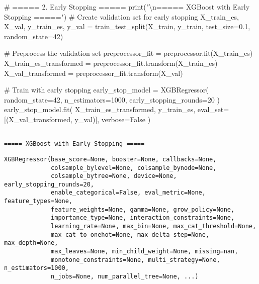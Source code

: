 \documentclass[
  letterpaper,
  DIV=11,
  numbers=noendperiod]{scrreprt}
\newenvironment{Shaded}{\begin{snugshade}}{\end{snugshade}}
\newcommand{\BuiltInTok}[1]{\textcolor[rgb]{0.00,0.23,0.31}{#1}}
\newcommand{\CharTok}[1]{\textcolor[rgb]{0.13,0.47,0.30}{#1}}
\newcommand{\CommentTok}[1]{\textcolor[rgb]{0.37,0.37,0.37}{#1}}
\newcommand{\DecValTok}[1]{\textcolor[rgb]{0.68,0.00,0.00}{#1}}
\newcommand{\FloatTok}[1]{\textcolor[rgb]{0.68,0.00,0.00}{#1}}
\newcommand{\NormalTok}[1]{\textcolor[rgb]{0.00,0.23,0.31}{#1}}
\newcommand{\OperatorTok}[1]{\textcolor[rgb]{0.37,0.37,0.37}{#1}}
\newcommand{\StringTok}[1]{\textcolor[rgb]{0.13,0.47,0.30}{#1}}
\newcommand{\VariableTok}[1]{\textcolor[rgb]{0.07,0.07,0.07}{#1}}
\begin{document}
\begin{Shaded}
\begin{Highlighting}[]
\CommentTok{\# ===== 2. Early Stopping =====}
\BuiltInTok{print}\NormalTok{(}\StringTok{"}\CharTok{\textbackslash{}n}\StringTok{===== XGBoost with Early Stopping ====="}\NormalTok{)}
\CommentTok{\# Create validation set for early stopping}
\NormalTok{X\_train\_es, X\_val, y\_train\_es, y\_val }\OperatorTok{=}\NormalTok{ train\_test\_split(X\_train, y\_train, test\_size}\OperatorTok{=}\FloatTok{0.1}\NormalTok{, random\_state}\OperatorTok{=}\DecValTok{42}\NormalTok{)}

\CommentTok{\# Preprocess the validation set}
\NormalTok{preprocessor\_fit }\OperatorTok{=}\NormalTok{ preprocessor.fit(X\_train\_es)}
\NormalTok{X\_train\_es\_transformed }\OperatorTok{=}\NormalTok{ preprocessor\_fit.transform(X\_train\_es)}
\NormalTok{X\_val\_transformed }\OperatorTok{=}\NormalTok{ preprocessor\_fit.transform(X\_val)}


\CommentTok{\# Train with early stopping}
\NormalTok{early\_stop\_model }\OperatorTok{=}\NormalTok{ XGBRegressor(}
\NormalTok{    random\_state}\OperatorTok{=}\DecValTok{42}\NormalTok{,}
\NormalTok{    n\_estimators}\OperatorTok{=}\DecValTok{1000}\NormalTok{,}
\NormalTok{    early\_stopping\_rounds}\OperatorTok{=}\DecValTok{20}
\NormalTok{)}
\NormalTok{early\_stop\_model.fit(}
\NormalTok{    X\_train\_es\_transformed, y\_train\_es,}
\NormalTok{    eval\_set}\OperatorTok{=}\NormalTok{[(X\_val\_transformed, y\_val)],}
\NormalTok{    verbose}\OperatorTok{=}\VariableTok{False}
\NormalTok{)}
\end{Highlighting}
\end{Shaded}

\begin{verbatim}

===== XGBoost with Early Stopping =====
\end{verbatim}

\begin{verbatim}
XGBRegressor(base_score=None, booster=None, callbacks=None,
             colsample_bylevel=None, colsample_bynode=None,
             colsample_bytree=None, device=None, early_stopping_rounds=20,
             enable_categorical=False, eval_metric=None, feature_types=None,
             feature_weights=None, gamma=None, grow_policy=None,
             importance_type=None, interaction_constraints=None,
             learning_rate=None, max_bin=None, max_cat_threshold=None,
             max_cat_to_onehot=None, max_delta_step=None, max_depth=None,
             max_leaves=None, min_child_weight=None, missing=nan,
             monotone_constraints=None, multi_strategy=None, n_estimators=1000,
             n_jobs=None, num_parallel_tree=None, ...)
\end{verbatim}
\end{document}
